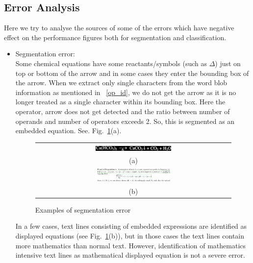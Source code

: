 \documentclass[12pt]{IEEEtran}
\begin{document}
\subsection{Error Analysis}
Here we try to analyse the sources of some of the errors which have negative effect on the performance figures both for segmentation and classification.
\begin{itemize}
 \item Segmentation error:\\
 
 Some chemical equations have some reactants/symbols (such as $\Delta$) just on top or bottom of the arrow   
 and in some cases they enter the bounding box of the arrow.  
  When we extract only single characters from the word blob information as mentioned in ~\ref{op_id},
 we do not get the arrow as it is no longer treated as a single character within its bounding box.
 Here the operator, arrow does not get detected and  the ratio between number of operands and number of operators exceeds 2.
 So, this is segmented as an embedded equation. See. Fig.~\ref{seg_error}(a).
 \begin{figure}[h]\center\footnotesize
\begin{tabular}{|c|}\hline
 \includegraphics[width=0.4\textwidth]{escan3.png} \\
 (a)\\ \hline
 \includegraphics[width=0.4\textwidth]{chem31.jpg}\\ 
  (b)\\ \hline
  \end{tabular} 
 \caption{Examples of segmentation error}
 \label{seg_error}
\end{figure}

In a few cases, text lines consisting of embedded expressions are identified as displayed equations 
(see Fig.~\ref{seg_error}(b)), but in those cases the text lines contain more mathematics than normal text.
However, identification of mathematics intensive text lines as mathematical displayed equation is not a severe error. 


\end{itemize}
\end{document}
